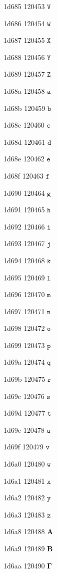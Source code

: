 \documentclass[11pt]{article}
\begin{document}
1d685 120453 \ensuremath{\mathtt{V}}

1d686 120454 \ensuremath{\mathtt{W}}

1d687 120455 \ensuremath{\mathtt{X}}

1d688 120456 \ensuremath{\mathtt{Y}}

1d689 120457 \ensuremath{\mathtt{Z}}

1d68a 120458 \ensuremath{\mathtt{a}}

1d68b 120459 \ensuremath{\mathtt{b}}

1d68c 120460 \ensuremath{\mathtt{c}}

1d68d 120461 \ensuremath{\mathtt{d}}

1d68e 120462 \ensuremath{\mathtt{e}}

1d68f 120463 \ensuremath{\mathtt{f}}

1d690 120464 \ensuremath{\mathtt{g}}

1d691 120465 \ensuremath{\mathtt{h}}

1d692 120466 \ensuremath{\mathtt{i}}

1d693 120467 \ensuremath{\mathtt{j}}

1d694 120468 \ensuremath{\mathtt{k}}

1d695 120469 \ensuremath{\mathtt{l}}

1d696 120470 \ensuremath{\mathtt{m}}

1d697 120471 \ensuremath{\mathtt{n}}

1d698 120472 \ensuremath{\mathtt{o}}

1d699 120473 \ensuremath{\mathtt{p}}

1d69a 120474 \ensuremath{\mathtt{q}}

1d69b 120475 \ensuremath{\mathtt{r}}

1d69c 120476 \ensuremath{\mathtt{s}}

1d69d 120477 \ensuremath{\mathtt{t}}

1d69e 120478 \ensuremath{\mathtt{u}}

1d69f 120479 \ensuremath{\mathtt{v}}

1d6a0 120480 \ensuremath{\mathtt{w}}

1d6a1 120481 \ensuremath{\mathtt{x}}

1d6a2 120482 \ensuremath{\mathtt{y}}

1d6a3 120483 \ensuremath{\mathtt{z}}

1d6a8 120488 \ensuremath{\mathbf{A}}

1d6a9 120489 \ensuremath{\mathbf{B}}

1d6aa 120490 \ensuremath{\mathbf{\Gamma}}
\end{document}
